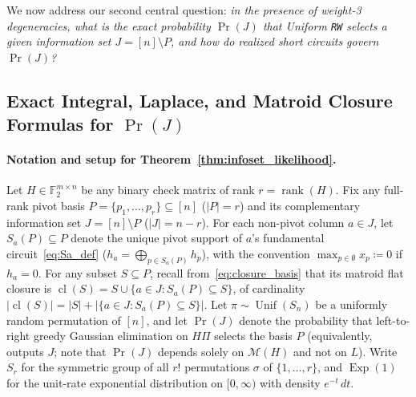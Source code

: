 \documentclass[12pt]{article}
\theoremstyle{definition}
\newcommand{\Ftwo}{\mathbb{F}_2}
\DeclareMathOperator{\rank}{rank}
\DeclareMathOperator{\cl}{cl}
\DeclareMathOperator{\Unif}{Unif}
\DeclareMathOperator{\Exp}{Exp}
\newcommand{\ttt}[1]{\texttt{#1}}
\begin{document}
We now address our second central question: \emph{in the presence of weight-3 degeneracies, what is the exact
probability $\Pr(J)$ that Uniform \ttt{RW} selects a given information set $J = [n] \setminus P$, and how do
realized short circuits govern $\Pr(J)$?}

\subsection{Exact Integral, Laplace, and Matroid Closure Formulas for
  \texorpdfstring{$\Pr(J)$}{Pr(J)}}\label{subsec:thm_infoset}

\paragraph{Notation and setup for Theorem~\ref{thm:infoset_likelihood}.}
Let $H \in \Ftwo^{m \times n}$ be any binary check matrix of rank $r = \rank(H)$. Fix any full-rank pivot basis $P
= \{p_1, \dots, p_r\} \subseteq [n]$ ($|P| = r$) and its complementary information set $J = [n] \setminus P$ ($|J|
= n - r$). For each non-pivot column $a \in J$, let $S_a(P) \subseteq P$ denote the unique pivot support of $a$'s
fundamental circuit~\eqref{eq:Sa_def} ($h_a = \bigoplus_{p \in S_a(P)} h_p$), with the convention $\max_{p \in
\emptyset} x_p \coloneqq 0$ if $h_a = 0$. For any subset $S \subseteq P$, recall from~\eqref{eq:closure_basis}
that its matroid flat closure is $\cl(S) = S \cup \{a \in J : S_a(P) \subseteq S\}$, of cardinality $|\cl(S)| =
|S| + |\{a \in J : S_a(P) \subseteq S\}|$. Let $\pi \sim \Unif(S_n)$ be a uniformly random permutation of $[n]$,
and let $\Pr(J)$ denote the probability that left-to-right greedy Gaussian elimination on $H \Pi$ selects the
basis $P$ (equivalently, outputs $J$; note that $\Pr(J)$ depends solely on $\mathcal{M}(H)$ and not on $L$). Write
$S_r$ for the symmetric group of all $r!$ permutations $\sigma$ of $\{1, \dots, r\}$, and $\Exp(1)$ for the
unit-rate exponential distribution on $[0, \infty)$ with density $e^{-t}\,dt$.
\end{document}
